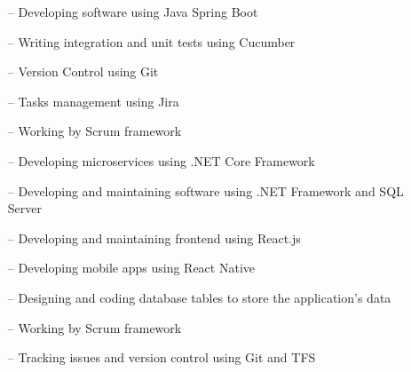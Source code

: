 \documentclass[10pt,a4paper]{altacv}
\begin{document}
\tagline{}

%

\begin{fullwidth}
\makecvheader
\end{fullwidth}

%





\begin{itemize}
    \setlength{\itemindent}{0.5em}
    \item[--]   \small{Developing software using Java Spring Boot}
    \item[--]   \small{Writing integration and unit tests using Cucumber}
    \item[--]   \small{Version Control using Git}
    \item[--]   \small{Tasks management using Jira}
    \item[--]   \small{Working by Scrum framework}
\end{itemize}

\medskip




\begin{itemize}
    \setlength{\itemindent}{0.5em}
    \item[--]   \small{Developing microservices using .NET Core Framework}
    \item[--]   \small{Developing and maintaining software using .NET Framework and SQL Server}
    \item[--]   \small{Developing and maintaining frontend using React.js}
    \item[--]   \small{Developing mobile apps using React Native}
    \item[--]   \small{Designing and coding database tables to store the application’s data}
    \item[--]   \small{Working by Scrum framework}
    \item[--]   \small{Tracking issues and version control using Git and TFS}
\end{itemize}
\end{document}

